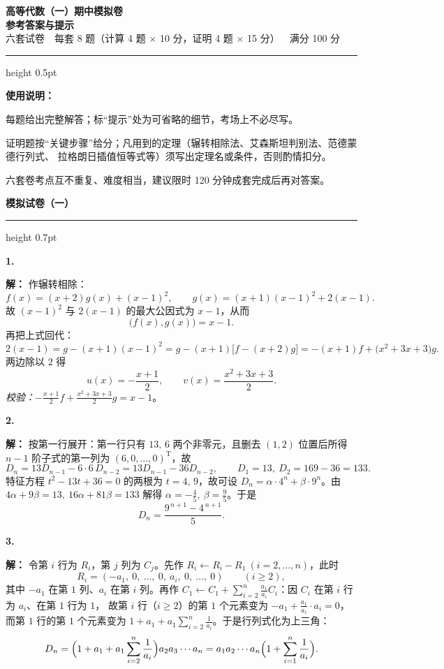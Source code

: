 \documentclass[11pt,a4paper,fontset=windows]{ctexart}
\newcommand{\paperhead}[1]{\Needspace{10\baselineskip}\par\vspace{16pt}%
  {\Large\bfseries\songti #1}\par\vspace{3pt}\hrule height 0.7pt\par\vspace{8pt}}
\newcommand{\sola}[2]{\Needspace{4\baselineskip}\par\vspace{10pt}%
  \noindent\textbf{#1}\hspace{0.45em}{\small\color{hdgray}\songti #2}\par\vspace{1pt}}
\newcommand{\sd}{\textbf{解：}}
\begin{document}
\begin{center}
{\LARGE\bfseries\songti 高等代数（一）期中模拟卷}\\[5pt]
{\LARGE\bfseries\songti 参考答案与提示}\\[8pt]
{\small\color{hdgray}\songti 六套试卷\ \ 每套 8 题（计算 4 题 $\times$ 10 分，证明 4 题 $\times$ 15 分）\ \ 满分 100 分}
\end{center}
\vspace{-2pt}
\hrule height 0.5pt
\vspace{6pt}

{\small\songti
\textbf{使用说明：}
\begin{note}
\item 每题给出完整解答；标“提示”处为可省略的细节，考场上不必尽写。
\item 证明题按“关键步骤”给分；凡用到的定理（辗转相除法、艾森斯坦判别法、范德蒙德行列式、
      拉格朗日插值恒等式等）须写出定理名或条件，否则酌情扣分。
\item 六套卷考点互不重复、难度相当，建议限时 120 分钟成套完成后再对答案。
\end{note}}

\paperhead{模拟试卷（一）}

\sola{1.}{（10 分）}\sd
作辗转相除：
\[
f(x)=(x+2)g(x)+(x-1)^{2},\qquad
g(x)=(x+1)(x-1)^{2}+2(x-1).
\]
故 $(x-1)^{2}$ 与 $2(x-1)$ 的最大公因式为 $x-1$，从而
\[
\bigl(f(x),g(x)\bigr)=x-1 .
\]
再把上式回代：
\[
2(x-1)=g-(x+1)(x-1)^{2}=g-(x+1)\bigl[f-(x+2)g\bigr]
=-(x+1)f+\bigl(x^{2}+3x+3\bigr)g .
\]
两边除以 $2$ 得
\[
u(x)=-\frac{x+1}{2},\qquad v(x)=\frac{x^{2}+3x+3}{2}.
\]
\emph{校验：}$-\frac{x+1}{2}f+\frac{x^{2}+3x+3}{2}g=x-1$。

\sola{2.}{（10 分）}\sd
按第一行展开：第一行只有 $13,\,6$ 两个非零元，且删去 $(1,2)$ 位置后所得 $n-1$ 阶子式的第一列为
$(6,0,\dots,0)^{\mathrm T}$，故
\[
D_n=13D_{n-1}-6\cdot 6\,D_{n-2}=13D_{n-1}-36D_{n-2},
\qquad D_1=13,\ D_2=169-36=133 .
\]
特征方程 $t^{2}-13t+36=0$ 的两根为 $t=4,\,9$，故可设 $D_n=\alpha\cdot 4^{n}+\beta\cdot 9^{n}$。由
$4\alpha+9\beta=13,\ 16\alpha+81\beta=133$ 解得 $\alpha=-\frac45,\ \beta=\frac95$。于是
\[
D_n=\frac{9^{\,n+1}-4^{\,n+1}}{5}.
\]

\sola{3.}{（10 分）}\sd
令第 $i$ 行为 $R_i$，第 $j$ 列为 $C_j$。先作 $R_i\leftarrow R_i-R_1\ (i=2,\dots,n)$，此时
\[
R_i=(-a_1,\ 0,\ \dots,\ 0,\ a_i,\ 0,\ \dots,\ 0)\qquad(i\ge 2),
\]
其中 $-a_1$ 在第 $1$ 列、$a_i$ 在第 $i$ 列。再作
$C_1\leftarrow C_1+\displaystyle\sum_{i=2}^{n}\frac{a_1}{a_i}C_i$：因 $C_i$ 在第 $i$ 行为 $a_i$、在第 $1$ 行为 $1$，
故第 $i$ 行（$i\ge2$）的第 $1$ 个元素变为 $-a_1+\frac{a_1}{a_i}\cdot a_i=0$，而第 $1$ 行的第 $1$ 个元素变为
$1+a_1+a_1\sum_{i=2}^{n}\frac1{a_i}$。于是行列式化为上三角：
\[
D_n=\Bigl(1+a_1+a_1\sum_{i=2}^{n}\frac1{a_i}\Bigr)a_2a_3\cdots a_n
=a_1a_2\cdots a_n\Bigl(1+\sum_{i=1}^{n}\frac1{a_i}\Bigr).
\]
\end{document}

